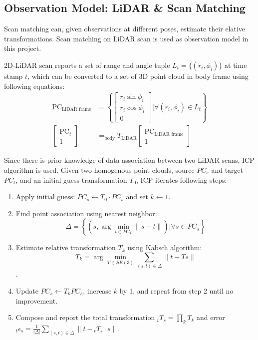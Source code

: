 \documentclass[conference]{IEEEtran}
\begin{document}
\subsection{Observation Model: LiDAR \& Scan Matching}
Scan matching can, given observations at different poses,
estimate their elative transformations.
Scan matching on LiDAR scan is used as observation model in this project.

2D-LiDAR scan reports a set of range and angle tuple $L_t = \{(r_i, \phi_i)\}$ at time stamp $t$,
which can be converted to a set of 3D point cloud in body frame using following equations:
$$
\begin{aligned}
    \mathrm{PC}_{\text{LiDAR frame}} 
        &= \left\{ \left[ \begin{gathered}r_i\sin \phi_i \\ r_i\cos \phi_i \\ 0\end{gathered} \right] \bigg| \forall (r_i, \phi_i)\in L_t\right\} 
        \\
    \left[ \begin{gathered} \mathrm{PC}_t \\ 1\end{gathered} \right]  
    &= _{\text{body}}T_{\text{LiDAR}}  \left[ \begin{gathered} \mathrm{PC}_{\text{LiDAR frame}}  \\ 1\end{gathered} \right]  
\end{aligned}
$$

Since there is  prior knowledge of data association between two LiDAR scans,
ICP algorithm is used.
Given two homogenous point clouds, source $PC_s$ and target $PC_t$, 
and an initial guess transformation $T_0$,
ICP iterates following steps:
\begin{enumerate}
    \item Apply initial guess: $PC_s \leftarrow T_0 \cdot PC_s$ and set $k \leftarrow 1$.
    
    \item Find point association using nearest neighbor:
    $$ \Delta = \left\{\left(s, \arg\min_{t\in PC_T} \|s - t\| \right) \bigg| \forall s\in PC_s\right\}$$

    \item Estimate relative transformation $T_k$ using Kabsch algorithm:
    $$T_k = \arg\min_{T\in SE(3)} \sum\limits_{(s,t)\in\Delta} \|t - Ts\|$$.
    
    \item Update $PC_s \leftarrow T_k PC_s$, increase $k$ by 1, and repeat from step 2 until no improvement.

    \item Compose and report the total transformation $_tT_s = \prod_k T_k$ and error 
    $_t\epsilon_s = \frac{1}{|\Delta|} \sum_{(s,t)\in\Delta} \|t - {}_tT_s\cdot s\|  $.
\end{enumerate}
\end{document}
